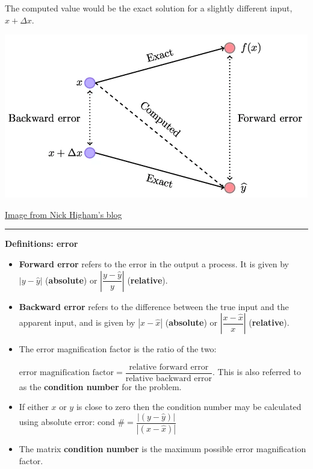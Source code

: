 \documentclass[12pt,letterpaper,noanswers]{exam}
\begin{document}
The computed value would be the exact solution for a slightly different input, $x + \Delta x$.




\includegraphics[scale=0.6]{img/C01errorNickHingham.png}

\href{https://nhigham.com/2020/03/25/what-is-backward-error/}{Image from Nick Higham's blog}



\vspace{0.2cm}
\hrule
\vspace{0.2cm}

\noindent \textbf{Definitions: error}

\begin{tcolorbox}
\begin{itemize}
\itemsep0pt
\item \textbf{Forward error} refers to the error in the output a process.  It is given by $\left\vert y - \hat{y}\right\vert$ (\textbf{absolute}) or $\left\vert \dfrac{y - \hat{y}}{y}\right\vert$ (\textbf{relative}).
\item \textbf{Backward error} refers to the difference between the true input and the apparent input, and is given by $\left\vert x - \hat{x}\right\vert$ (\textbf{absolute}) or $\left\vert \dfrac{x - \hat{x}}{x}\right\vert$ (\textbf{relative}).
\item The error magnification factor is the ratio of the two: 

$\text{error magnification factor} = \dfrac{\text{relative forward error}}{\text{relative backward error}}$.  This is also referred to as the \textbf{condition number} for the problem.

\item If either $x$ or $y$ is close to zero then the condition number may be calculated using absolute error: $\text{cond } \#=\dfrac{\left\vert (y - \hat{y})\right\vert}{\left\vert (x - \hat{x})\right\vert}$

\item The matrix \textbf{condition number} is the maximum possible error magnification factor.


\end{itemize}
\end{tcolorbox}
\end{document}
